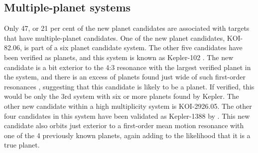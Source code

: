 \subsection{Multiple-planet systems}
Only 47, or 21 per cent of the new planet candidates are associated with targets that have multiple-planet candidates. One of the new planet candidates, KOI-82.06, is part of a six planet candidate system. The other five candidates have been verified as planets, and this system is known as Kepler-102 \citep{Marcy2014,Rowe2014}. The new candidate is a bit exterior to the 4:3 resonance with the largest verified planet in the system, and there is an excess of planets found just wide of such first-order resonances \citep{Lissauer2011}, suggesting that this candidate is likely to be a planet. If verified, this would be only the 3rd system with six or more planets found by Kepler. 
The other new candidate within a high multiplicity system is KOI-2926.05. The other four candidates in this system have been validated as Kepler-1388 by \citet{Morton2016}. This new candidate also orbits just exterior to a first-order mean motion resonance with one of the 4 previously known planets, again adding to the likelihood that it is a true planet.

